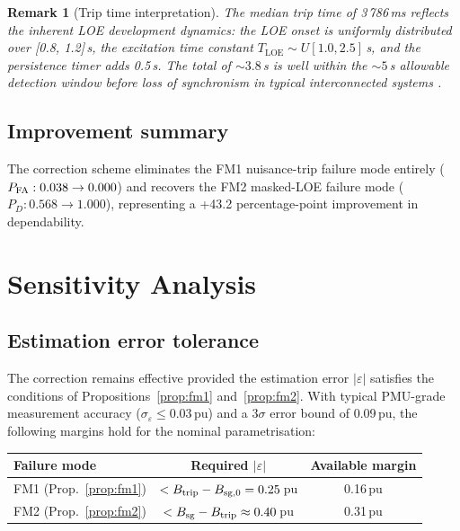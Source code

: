 \documentclass[11pt,a4paper]{article}
\newtheorem{remark}{Remark}
\newcommand{\Btrip}{B_{\mathrm{trip}}}
\newcommand{\Tloe}{T_{\mathrm{LOE}}}
\begin{document}
\begin{remark}[Trip time interpretation]
  The median trip time of 3\,786\,ms reflects the inherent LOE development
  dynamics: the LOE onset is uniformly distributed over [0.8, 1.2]\,s, the
  excitation time constant $\Tloe \sim U[1.0, 2.5]$\,s, and the persistence
  timer adds 0.5\,s.  The total of $\sim 3.8$\,s is well within the
  $\sim 5$\,s allowable detection window before loss of synchronism in
  typical interconnected systems \cite{Kundur1994}.
\end{remark}

\subsection{Improvement summary}

The correction scheme eliminates the FM1 nuisance-trip failure mode entirely
($P_{\rm FA}: 0.038 \to 0.000$) and recovers the FM2 masked-LOE failure mode
($P_D: 0.568 \to 1.000$), representing a +43.2 percentage-point improvement in
dependability.

\section{Sensitivity Analysis}
\label{sec:sensitivity}

\subsection{Estimation error tolerance}
\label{sec:est_error}

The correction remains effective provided the estimation error $|\varepsilon|$
satisfies the conditions of Propositions~\ref{prop:fm1} and~\ref{prop:fm2}.
With typical PMU-grade measurement accuracy ($\sigma_\varepsilon \leq 0.03$\,pu)
and a $3\sigma$ error bound of 0.09\,pu, the following margins hold for the
nominal parametrisation:

\begin{center}
\begin{tabular}{lcc}
  \toprule
  Failure mode & Required $|\varepsilon|$ & Available margin \\
  \midrule
  FM1 (Prop.~\ref{prop:fm1}) & $< \Btrip - B_{\rm sg,0} = 0.25$\,pu & 0.16\,pu \\
  FM2 (Prop.~\ref{prop:fm2}) & $< B_{\rm sg} - \Btrip \approx 0.40$\,pu & 0.31\,pu \\
  \bottomrule
\end{tabular}
\end{center}
\end{document}
